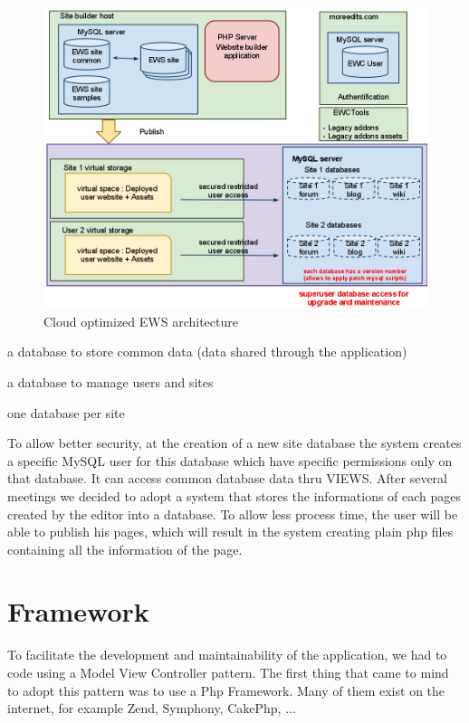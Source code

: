 \begin{figure}[h!]
\centering
\includegraphics[width=.55\textwidth]{img/ews_archi_after.png}
\caption{Cloud optimized EWS architecture }
\label{figure:ews_archi_after}
\end{figure}

\begin{itemize*}
\item a database to store common data (data shared through the application)
\item a database to manage users and sites
\item one database per site 
\end{itemize*}

To allow better security, at the creation of a new site database the system creates a specific MySQL user for this database which have specific permissions only on that database. It can access common database data thru VIEWS.
After several meetings we decided to adopt a system that stores the informations of each pages created by the editor into a database. To allow less process time, the user will be able to publish his pages, which will result in the system creating plain php files containing all the information of the page.

\section{Framework}

To facilitate the development and maintainability of the application, we had to code using a Model View Controller pattern. The first thing that came to mind to adopt this pattern was to use a Php Framework. Many of them exist on the internet, for example Zend, Symphony, CakePhp, ... 


